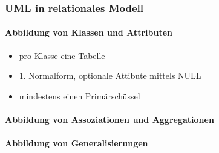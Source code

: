             \subsubsection{UML in relationales Modell}
                \paragraph{Abbildung von Klassen und Attributen}
                    \begin{itemize}
                    \setlength{\itemsep}{0pt}    
                        \item pro Klasse eine Tabelle
                        \item 1. Normalform, optionale Attibute mittels NULL
                        \item mindestens einen Primärschüssel
                    \end{itemize}
                \paragraph{Abbildung von Assoziationen und Aggregationen}
                \paragraph{Abbildung von Generalisierungen}